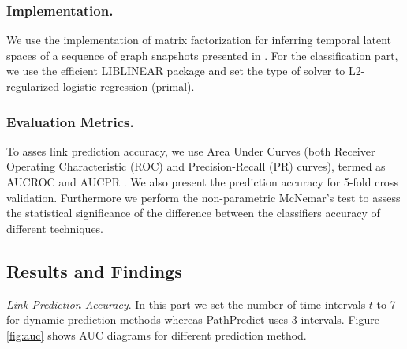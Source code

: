 \subsubsection{Implementation.} We use the implementation of matrix factorization for inferring temporal latent spaces of a sequence of graph snapshots presented in \cite{Zhu2016}. For the classification part, we use the efficient LIBLINEAR \cite{fan2008liblinear} package and set the type of solver to L2-regularized logistic regression (primal). %


\subsubsection{Evaluation Metrics.} 

To asses link prediction accuracy, we use Area Under Curves (both Receiver Operating Characteristic (ROC) and Precision-Recall (PR) curves), termed as AUCROC and AUCPR \cite{davis2006relationship}. We also present the prediction accuracy for 5-fold cross validation. Furthermore we perform the non-parametric McNemar's test \cite{mcnemar1947note} to assess the statistical significance of the difference between the classifiers accuracy of different techniques.

\subsection{Results and Findings}

\textit{Link Prediction Accuracy}. In this part we set the number of time intervals $t$ to 7 for dynamic prediction methods whereas PathPredict uses 3 intervals. Figure \ref{fig:auc} shows AUC diagrams for different prediction method.


